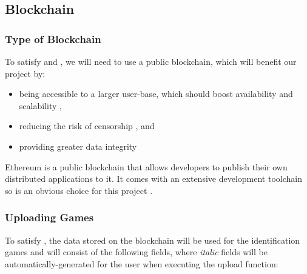 
\subsection{Blockchain}

\subsubsection*{Type of Blockchain}

To satisfy  and , we will need to use a public blockchain, which will benefit our project by:
\vspace{2mm}
\begin{itemize}
  \item being accessible to a larger user-base, which should boost availability and scalability ,
  \item reducing the risk of censorship , and
  \item providing greater data integrity 
\end{itemize}

\vspace{2mm}\noindent Ethereum is a public blockchain that allows developers to publish their own distributed applications to it. It comes with an extensive development toolchain so is an obvious choice for this project .

\subsubsection*{Uploading Games}
\label{subsubsec:eth-data}

To satisfy , the data stored on the blockchain will be used for the identification games and will consist of the following fields, where \textit{italic} fields will be automatically-generated for the user when executing the upload function:

